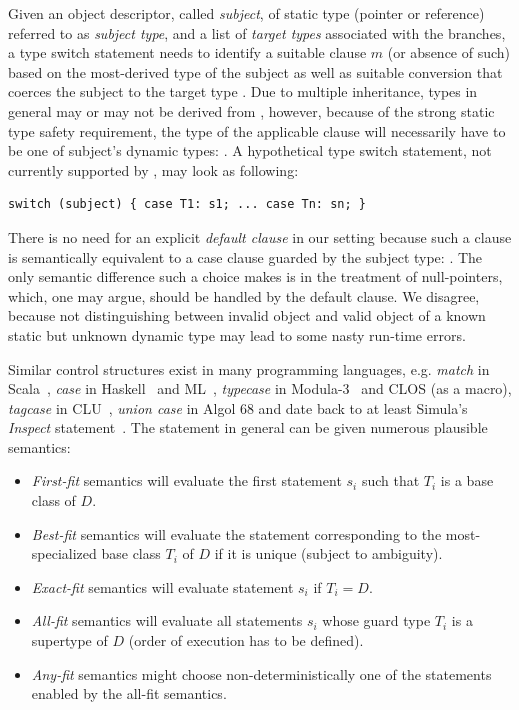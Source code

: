 Given an object descriptor, called \emph{subject}, of static type  
(pointer or reference) referred to as \emph{subject type}, and a list of 
\emph{target types}  associated with the branches, a type switch 
statement needs to identify a suitable clause $m$ (or absence of such) based on 
the most-derived type  of the subject as well as suitable 
conversion that coerces the subject to the target type .  
Due to multiple inheritance, types  in general may or may not be 
derived from , however, because of the strong static type safety 
requirement, the type of the applicable clause  will necessarily have to be 
one of subject's dynamic types: . A hypothetical type switch 
statement, not currently supported by \Cpp{}, may look as following:

\begin{lstlisting}[keepspaces]
switch (subject) { case T1: s1; ... case Tn: sn; }
\end{lstlisting}

\noindent
There is no need for an explicit \emph{default clause} in our setting because 
such a clause is semantically equivalent to a case clause guarded by the 
subject type: . The only semantic difference such a choice 
makes is in the treatment of null-pointers, which, one may argue, should be 
handled by the default clause. We disagree, because not distinguishing between 
invalid object and valid object of a known static but unknown dynamic type may 
lead to some nasty run-time errors.

Similar control structures exist in many programming languages, e.g. 
\emph{match} in Scala~\cite{Scala2nd}, \emph{case} in Haskell~\cite{Haskell98Book} and 
ML~\cite{ML90}, \emph{typecase} in Modula-3~\cite{Modula3TS} and CLOS (as a 
macro), \emph{tagcase} in CLU~\cite{CLURefMan}, \emph{union case} in Algol 68 
and date back to at least Simula's \emph{Inspect} statement~\cite{Simula67}. 
The statement in general can be given numerous plausible semantics:

\begin{itemize}
\setlength{\itemsep}{0pt}
\setlength{\parskip}{0pt}
\item \emph{First-fit} semantics will evaluate the first statement $s_i$ such 
      that $T_i$ is a base class of $D$.
\item \emph{Best-fit} semantics will evaluate the statement corresponding to the 
      most-specialized base class $T_i$ of $D$ if it is unique (subject to 
      ambiguity).
\item \emph{Exact-fit} semantics will evaluate statement $s_i$ if $T_i=D$.
\item \emph{All-fit} semantics will evaluate all statements $s_i$ whose guard 
      type $T_i$ is a supertype of $D$ (order of execution has to be defined).
\item \emph{Any-fit} semantics might choose non-deterministically one of the 
      statements enabled by the all-fit semantics.
\end{itemize}

